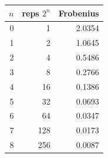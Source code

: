 \begin{tabular}{r r r}
\toprule
$n$ & reps $2^n$ & Frobenius \\
\midrule
0 & 1 & 2.0354 \\
1 & 2 & 1.0645 \\
2 & 4 & 0.5486 \\
3 & 8 & 0.2766 \\
4 & 16 & 0.1386 \\
5 & 32 & 0.0693 \\
6 & 64 & 0.0347 \\
7 & 128 & 0.0173 \\
8 & 256 & 0.0087 \\
\bottomrule
\end{tabular}
